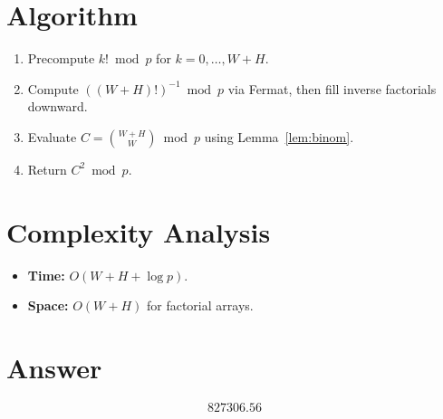 \documentclass[11pt]{article}
\begin{document}
\section{Algorithm}

\begin{enumerate}
\item Precompute $k! \bmod p$ for $k = 0,\ldots,W+H$.
\item Compute $((W+H)!)^{-1} \bmod p$ via Fermat, then fill inverse factorials downward.
\item Evaluate $C = \binom{W+H}{W} \bmod p$ using Lemma~\ref{lem:binom}.
\item Return $C^2 \bmod p$.
\end{enumerate}

\section{Complexity Analysis}

\begin{itemize}
\item \textbf{Time:} $O(W+H+\log p)$.
\item \textbf{Space:} $O(W+H)$ for factorial arrays.
\end{itemize}

\section{Answer}

\[
\boxed{827306.56}
\]
\end{document}
